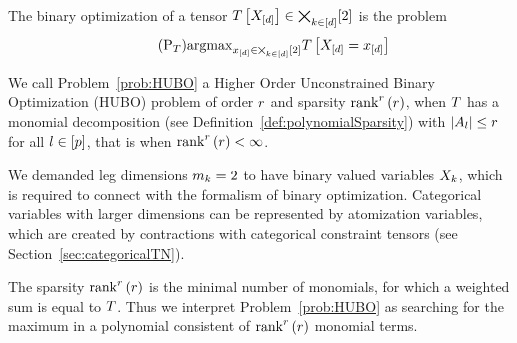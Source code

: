 \begin{definition}
	The binary optimization of a tensor $T\left[X_{[d]}\right]\in\bigtimes_{k\in[d]}[2]$ is the problem
	\begin{align}\tag{$\mathrm{P}_{\hypercore}$}\label{prob:HUBO}
		\argmax_{\shortcatindices\in\atomstates} \hypercoreat{\indexedshortcatvariables} 
	\end{align}
	
	We call Problem~\ref{prob:HUBO} a Higher Order Unconstrained Binary Optimization (HUBO) problem of order $r$ and sparsity $\mathrm{rank}^{r}\left(r\right)$, when $T$ has a monomial decomposition (see Definition~\ref{def:polynomialSparsity}) with $\left|A_{l}\right|\leq r$ for all $l\in[p]$, that is when $\mathrm{rank}^{r}\left(r\right)<\infty$.
	
	
\end{definition}


\begin{remark}
	We demanded leg dimensions $m_{k}=2$ to have binary valued variables $X_{k}$, which is required to connect with the formalism of binary optimization.
	Categorical variables with larger dimensions can be represented by atomization variables, which are created by contractions with categorical constraint tensors (see Section~\ref{sec:categoricalTN}).
\end{remark}


The sparsity $\mathrm{rank}^{r}\left(r\right)$ is the minimal number of monomials, for which a weighted sum is equal to $T$.
Thus we interpret Problem~\ref{prob:HUBO} as searching for the maximum in a polynomial consistent of $\mathrm{rank}^{r}\left(r\right)$ monomial terms.



%
%
%




